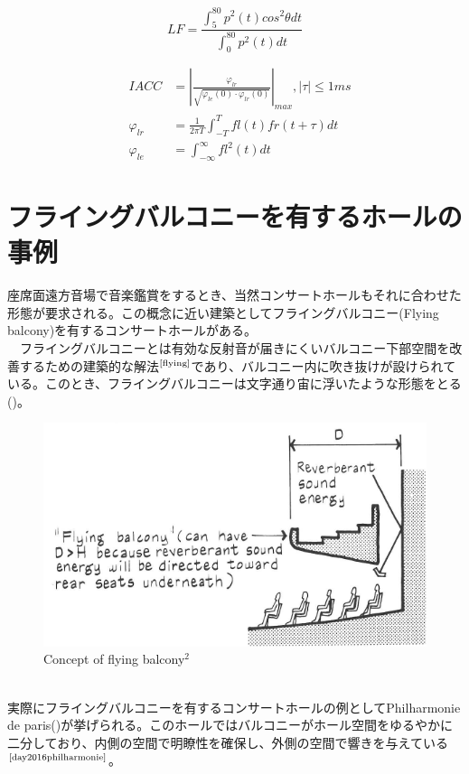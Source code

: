 \begin{equation}
    \label{eq:lf}
  LF = \frac{\displaystyle\int_5^{80}p^2(t)cos^2{\theta}dt}{\displaystyle\int_0^{80}p^2(t)dt} 
\end{equation}

\begin{eqnarray}
\label{eq:iacc}
&IACC&=\left|\frac{\varphi_{lr}}{\sqrt{\varphi_{le}(0)\cdot \varphi_{lr}(0)}}\right|_{max}, |\tau|\le1ms
\\
&\varphi_{lr}&=\frac{1}{2\pi T}\int_{-T}^{T}fl(t)fr(t+\tau)dt
\\
&\varphi_{le}&=\int_{-\infty}^{\infty}fl^2(t)dt
\end{eqnarray}

\pagebreak
\section{フライングバルコニーを有するホールの事例}
座席面遠方音場で音楽鑑賞をするとき、当然コンサートホールもそれに合わせた形態が要求される。この概念に近い建築としてフライングバルコニー(Flying balcony)を有するコンサートホールがある。
\\　フライングバルコニーとは有効な反射音が届きにくいバルコニー下部空間を改善するための建築的な解法$^{\text{\cite{flying}}}$であり、バルコニー内に吹き抜けが設けられている。このとき、フライングバルコニーは文字通り宙に浮いたような形態をとる()。
\begin{figure}[htbp]
    \centering
    \includegraphics[keepaspectratio,scale=1]{01_att/flyingbalcony.pdf}
    \caption{\hspace{1mm}Concept of flying balcony$^2$}
    \label{fig:flyigbalcony}
\end{figure}
\\ 実際にフライングバルコニーを有するコンサートホールの例としてPhilharmonie de paris()が挙げられる。このホールではバルコニーがホール空間をゆるやかに二分しており、内側の空間で明瞭性を確保し、外側の空間で響きを与えている$^{\text{\cite{day2016philharmonie}}}$。
